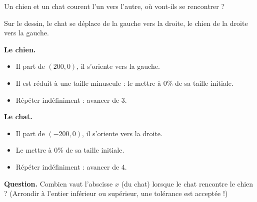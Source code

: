 \documentclass[class=report,crop=false, 12pt]{standalone}
\begin{document}

\begin{enigme}

Un chien et un chat courent l'un vers l'autre, où vont-ils se rencontrer ?


Sur le dessin, le chat se déplace de la gauche vers la droite, le chien de la droite vers la gauche.




\textbf{Le chien.}
\begin{itemize}
  \item Il part de $(200,0)$, il s'oriente vers la gauche.
  \item Il est réduit à une taille minuscule : le mettre à $0 \%$ de sa taille initiale.
  \item Répéter indéfiniment : avancer de $3$.
\end{itemize}

\textbf{Le chat.}
\begin{itemize}
  \item Il part de $(-200,0)$, il s'oriente vers la droite.
  \item Le mettre à $0 \%$ de sa taille initiale.
  \item Répéter indéfiniment : avancer de $4$.
\end{itemize}


\bigskip

\textbf{Question.} Combien vaut l'abscisse $x$ (du chat) lorsque le chat rencontre le chien ?
(Arrondir à l'entier inférieur ou supérieur, une tolérance est acceptée !)



\end{enigme}
\end{document}
